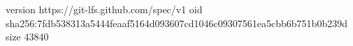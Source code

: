 version https://git-lfs.github.com/spec/v1
oid sha256:7fdb538313a5444feaaf5164d093607cd1046c09307561ea5cbb6b751b0b239d
size 43840

